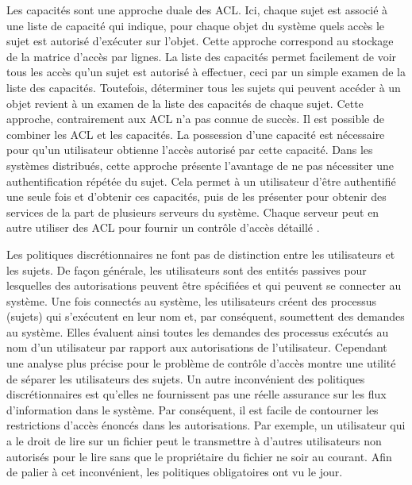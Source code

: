 \label{sectionListeCapacité}

Les capacités sont une approche duale des ACL. Ici, chaque sujet est associé à une liste de capacité qui indique, pour chaque objet du système quels accès le sujet est autorisé d'exécuter sur l'objet. Cette approche correspond au stockage de la matrice d'accès par lignes. La liste des capacités permet facilement de voir tous les accès qu'un sujet est autorisé à effectuer, ceci par un simple examen de la liste des capacités. Toutefois, déterminer tous les sujets qui peuvent accéder à un objet revient à un examen de la liste des capacités de chaque sujet. Cette approche, contrairement aux ACL n'a pas connue de succès. Il est possible de combiner les ACL et les capacités. La possession d'une capacité est nécessaire pour qu'un utilisateur obtienne l'accès autorisé par cette capacité. Dans les systèmes distribués, cette approche présente l'avantage de ne pas nécessiter une authentification répétée du sujet. Cela permet à un utilisateur d'être authentifié une seule fois et d'obtenir ces capacités, puis de les présenter pour obtenir des services de la part de plusieurs serveurs du système. Chaque serveur peut en autre utiliser des ACL pour fournir un contrôle d'accès détaillé \cite{sandhu94}.

\label{sectionVulnérabilitéDAC}

Les politiques discrétionnaires ne font pas de distinction entre les utilisateurs et les sujets. De façon  générale, les utilisateurs sont des entités passives pour lesquelles des autorisations peuvent être spécifiées et qui peuvent se connecter au système. Une fois connectés au système, les utilisateurs créent des processus (sujets) qui s'exécutent en leur nom et, par conséquent, soumettent des demandes au système. Elles évaluent ainsi toutes les demandes des processus exécutés au nom d'un utilisateur par rapport aux autorisations de l'utilisateur. Cependant une analyse plus précise pour le problème de contrôle d'accès montre une utilité de séparer les utilisateurs des sujets. Un autre inconvénient des politiques discrétionnaires est qu'elles ne fournissent pas une réelle assurance sur les flux d'information dans le système. Par conséquent, il est facile de contourner les restrictions d'accès énoncés dans les autorisations. Par exemple, un utilisateur qui a le droit de lire sur un fichier peut le transmettre à d'autres utilisateurs non autorisés pour le lire sans que le propriétaire du fichier ne soir au courant. Afin de palier à cet inconvénient, les politiques obligatoires ont vu le jour.


